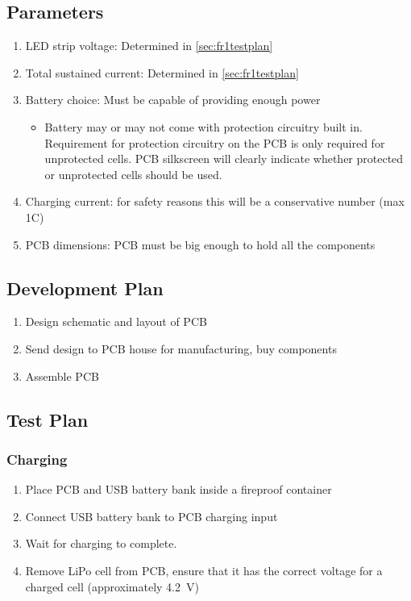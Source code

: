 \documentclass{notes}
\begin{document}
\subsection{Parameters}

\begin{enumerate}
    \item LED strip voltage: Determined in \autoref{sec:fr1testplan}
    \item Total sustained current: Determined in \autoref{sec:fr1testplan}
    \item Battery choice: Must be capable of providing enough power
    \begin{itemize}
        \item Battery may or may not come with protection circuitry built in.
        Requirement for protection circuitry on the PCB is only required for unprotected cells.
        PCB silkscreen will clearly indicate whether protected or unprotected cells should be used.
    \end{itemize}
    \item Charging current: for safety reasons this will be a conservative number (max 1C)
    \item PCB dimensions: PCB must be big enough to hold all the components
\end{enumerate}

\subsection{Development Plan}

\begin{enumerate}
    \item Design schematic and layout of PCB
    \item Send design to PCB house for manufacturing, buy components
    \item Assemble PCB
\end{enumerate}

\subsection{Test Plan}

\subsubsection{Charging}

\begin{enumerate}
    \item Place PCB and USB battery bank inside a fireproof container
    \item Connect USB battery bank to PCB charging input
    \item Wait for charging to complete.
    \item Remove LiPo cell from PCB, ensure that it has the correct voltage for a charged cell (approximately \SI{4.2}{\volt})
\end{enumerate}
\end{document}
